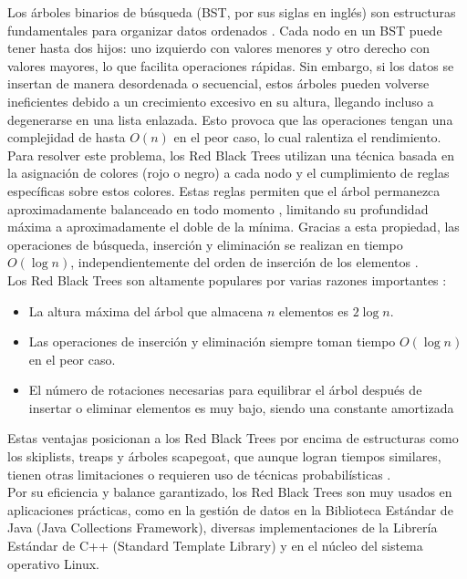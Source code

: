 \documentclass[conference]{IEEEtran}
\begin{document}
Los árboles binarios de búsqueda (BST, por sus siglas en inglés) son estructuras fundamentales para organizar datos ordenados \cite{baeldungRedBlack}. Cada nodo en un BST puede tener hasta dos hijos: uno izquierdo con valores menores y otro derecho con valores mayores, lo que facilita operaciones rápidas. Sin embargo, si los datos se insertan de manera desordenada o secuencial, estos árboles pueden volverse ineficientes debido a un crecimiento excesivo en su altura, llegando incluso a degenerarse en una lista enlazada. Esto provoca que las operaciones tengan una complejidad de hasta \( O(n) \) en el peor caso, lo cual ralentiza  el rendimiento.\\

Para resolver este problema, los Red Black Trees utilizan una técnica basada en la asignación de colores (rojo o negro) a cada nodo y el cumplimiento de reglas específicas sobre estos colores. Estas reglas permiten que el árbol permanezca aproximadamente balanceado en todo momento \cite{mushiba2024redblack}, limitando su profundidad máxima a aproximadamente el doble de la mínima. Gracias a esta propiedad, las operaciones de búsqueda, inserción y eliminación se realizan en tiempo \( O(\log n) \), independientemente del orden de inserción de los elementos \cite{mushiba2024redblack}.\\

Los Red Black Trees son altamente populares por varias razones importantes \cite{morin2013ods}:

\begin{itemize}
    \item La altura máxima del árbol que almacena \( n \) elementos es \( 2 \log n \).
    \item Las operaciones de inserción y eliminación siempre toman tiempo \( O(\log n) \) en el peor caso.
    \item El número de rotaciones necesarias para equilibrar el árbol después de insertar o eliminar elementos es muy bajo, siendo una constante amortizada 
\end{itemize} 

Estas ventajas posicionan a los Red Black Trees por encima de estructuras como los skiplists, treaps y árboles scapegoat, que aunque logran tiempos similares, tienen otras limitaciones o requieren uso de técnicas probabilísticas \cite{morin2013ods}.\\

Por su eficiencia y balance garantizado, los Red Black Trees son muy usados en aplicaciones prácticas, como en la gestión de datos en la Biblioteca Estándar de Java (Java Collections Framework), diversas implementaciones de la Librería Estándar de C++ (Standard Template Library) y en el núcleo del sistema operativo Linux\cite{morin2013ods}.\\
\end{document}
